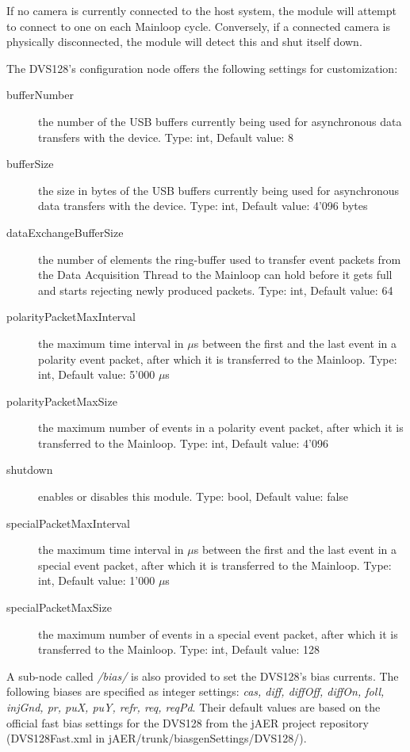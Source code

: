 \documentclass[a4paper,12pt]{report}
\begin{document}
If no camera is currently connected to the host system, the module will attempt to connect to one on each Mainloop cycle. Conversely, if a connected camera is physically disconnected, the module will detect this and shut itself down.

The DVS128's configuration node offers the following settings for customization:
\begin{description}
\item[bufferNumber] the number of the USB buffers currently being used for asynchronous data transfers with the device.
\subitem Type: int, Default value: 8
\item[bufferSize] the size in bytes of the USB buffers currently being used for asynchronous data transfers with the device.
\subitem Type: int, Default value: 4'096 bytes
\item[dataExchangeBufferSize] the number of elements the ring-buffer used to transfer event packets from the Data Acquisition Thread to the Mainloop can hold before it gets full and starts rejecting newly produced packets.
\subitem Type: int, Default value: 64
\item[polarityPacketMaxInterval] the maximum time interval in $\mu$s between the first and the last event in a polarity event packet, after which it is transferred to the Mainloop.
\subitem Type: int, Default value: 5'000 $\mu$s
\item[polarityPacketMaxSize]  the maximum number of events in a polarity event packet, after which it is transferred to the Mainloop.
\subitem Type: int, Default value: 4'096
\item[shutdown] enables or disables this module.
\subitem Type: bool, Default value: false
\item[specialPacketMaxInterval] the maximum time interval in $\mu$s between the first and the last event in a special event packet, after which it is transferred to the Mainloop.
\subitem Type: int, Default value: 1'000 $\mu$s
\item[specialPacketMaxSize] the maximum number of events in a special event packet, after which it is transferred to the Mainloop.
\subitem Type: int, Default value: 128
\end{description}

A sub-node called \emph{/bias/} is also provided to set the DVS128's bias currents.
The following biases are specified as integer settings: \emph{cas, diff, diffOff, diffOn, foll, injGnd, pr, puX, puY, refr, req, reqPd}. Their default values are based on the official fast bias settings for the DVS128 from the jAER project \cite{jaer_project} repository (DVS128Fast.xml in jAER/trunk/biasgenSettings/DVS128/).
\end{document}
